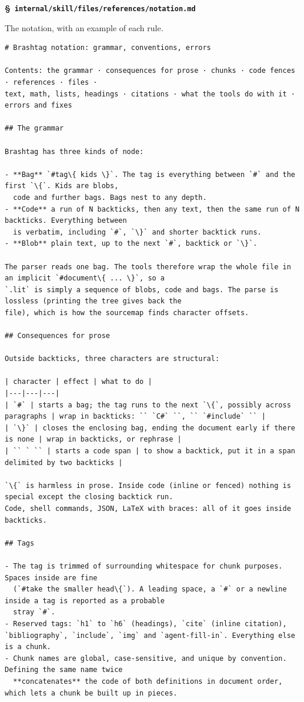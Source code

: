 \documentclass[10pt,a4paper]{article}
\newcounter{chunk}
\renewcommand{\thechunk}{\S\arabic{chunk}}
\newcommand{\chunkhead}[2]{\par\addvspace{1.2ex}\noindent\refstepcounter{chunk}\label{#1}{\bfseries\thechunk}\enspace #2\par\nopagebreak}
\newcommand{\filebadge}{{\footnotesize\itshape\color{tuftegray}file}}
\begin{document}
\chunkhead{chunk281}{\filebadge\ \textbf{\texttt{internal/\allowbreak{}skill/\allowbreak{}files/\allowbreak{}references/\allowbreak{}notation.\allowbreak{}md}}}
The notation, with an example of each rule.
\begin{Verbatim}
# Brashtag notation: grammar, conventions, errors

Contents: the grammar · consequences for prose · chunks · code fences · references · files ·
text, math, lists, headings · citations · what the tools do with it · errors and fixes

## The grammar

Brashtag has three kinds of node:

- **Bag** `#tag\{ kids \}`. The tag is everything between `#` and the first `\{`. Kids are blobs,
  code and further bags. Bags nest to any depth.
- **Code** a run of N backticks, then any text, then the same run of N backticks. Everything between
  is verbatim, including `#`, `\}` and shorter backtick runs.
- **Blob** plain text, up to the next `#`, backtick or `\}`.

The parser reads one bag. The tools therefore wrap the whole file in an implicit `#document\{ ... \}`, so a
`.lit` is simply a sequence of blobs, code and bags. The parse is lossless (printing the tree gives back the
file), which is how the sourcemap finds character offsets.

## Consequences for prose

Outside backticks, three characters are structural:

| character | effect | what to do |
|---|---|---|
| `#` | starts a bag; the tag runs to the next `\{`, possibly across paragraphs | wrap in backticks: `` `C#` ``, `` `#include` `` |
| `\}` | closes the enclosing bag, ending the document early if there is none | wrap in backticks, or rephrase |
| `` ` `` | starts a code span | to show a backtick, put it in a span delimited by two backticks |

`\{` is harmless in prose. Inside code (inline or fenced) nothing is special except the closing backtick run.
Code, shell commands, JSON, LaTeX with braces: all of it goes inside backticks.

## Tags

- The tag is trimmed of surrounding whitespace for chunk purposes. Spaces inside are fine
  (`#take the smaller head\{`). A leading space, a `#` or a newline inside a tag is reported as a probable
  stray `#`.
- Reserved tags: `h1` to `h6` (headings), `cite` (inline citation), `bibliography`, `include`, `img` and `agent-fill-in`. Everything else is a chunk.
- Chunk names are global, case-sensitive, and unique by convention. Defining the same name twice
  **concatenates** the code of both definitions in document order, which lets a chunk be built up in pieces.


\end{Verbatim}
\end{document}
